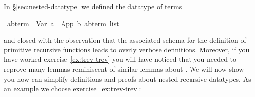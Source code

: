 %
\begin{isabellebody}%
\def\isabellecontext{Nested0}%
%
\begin{isamarkuptext}%
In \S\ref{sec:nested-datatype} we defined the datatype of terms%
\end{isamarkuptext}%
\ {\isacharparenleft}{\isacharprime}a{\isacharcomma}{\isacharprime}b{\isacharparenright}{\isachardoublequote}term{\isachardoublequote}\ {\isacharequal}\ Var\ {\isacharprime}a\ {\isacharbar}\ App\ {\isacharprime}b\ {\isachardoublequote}{\isacharparenleft}{\isacharprime}a{\isacharcomma}{\isacharprime}b{\isacharparenright}term\ list{\isachardoublequote}%
\begin{isamarkuptext}%
\noindent
and closed with the observation that the associated schema for the definition
of primitive recursive functions leads to overly verbose definitions. Moreover,
if you have worked exercise~\ref{ex:trev-trev} you will have noticed that
you needed to reprove many lemmas reminiscent of similar lemmas about
. We will now show you how  can simplify
definitions and proofs about nested recursive datatypes. As an example we
choose exercise~\ref{ex:trev-trev}:%
\end{isamarkuptext}%
\end{isabellebody}%
